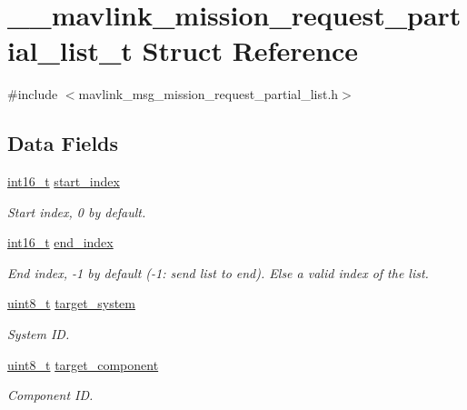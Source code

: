 \hypertarget{struct____mavlink__mission__request__partial__list__t}{\section{\-\_\-\-\_\-mavlink\-\_\-mission\-\_\-request\-\_\-partial\-\_\-list\-\_\-t Struct Reference}
\label{struct____mavlink__mission__request__partial__list__t}
}


{\ttfamily \#include $<$mavlink\-\_\-msg\-\_\-mission\-\_\-request\-\_\-partial\-\_\-list.\-h$>$}

\subsection*{Data Fields}
\begin{DoxyCompactItemize}
\item 
\hyperlink{stdint_8h_aa343fa3b3d06292b959ffdd4c4703b06}{int16\-\_\-t} \hyperlink{struct____mavlink__mission__request__partial__list__t_aa88d56cd8a892b8416b49a6e0ec9b5cf}{start\-\_\-index}
\begin{DoxyCompactList}\small\item\em Start index, 0 by default. \end{DoxyCompactList}\item 
\hyperlink{stdint_8h_aa343fa3b3d06292b959ffdd4c4703b06}{int16\-\_\-t} \hyperlink{struct____mavlink__mission__request__partial__list__t_a9e484b80b2b8a0ced10f414e2d6c2636}{end\-\_\-index}
\begin{DoxyCompactList}\small\item\em End index, -\/1 by default (-\/1\-: send list to end). Else a valid index of the list. \end{DoxyCompactList}\item 
\hyperlink{stdint_8h_aba7bc1797add20fe3efdf37ced1182c5}{uint8\-\_\-t} \hyperlink{struct____mavlink__mission__request__partial__list__t_aa4ec7ce5b44a621b414861aa5e575cc6}{target\-\_\-system}
\begin{DoxyCompactList}\small\item\em System I\-D. \end{DoxyCompactList}\item 
\hyperlink{stdint_8h_aba7bc1797add20fe3efdf37ced1182c5}{uint8\-\_\-t} \hyperlink{struct____mavlink__mission__request__partial__list__t_abc11feeb766eb42c7eadff5850284cd2}{target\-\_\-component}
\begin{DoxyCompactList}\small\item\em Component I\-D. \end{DoxyCompactList}\end{DoxyCompactItemize}


